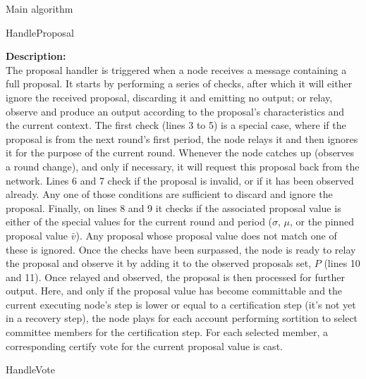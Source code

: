 \documentclass[10pt,a4paper]{article}
\begin{document}
\begin{section}{Main algorithm}
\begin{subsection}{HandleProposal}
    
    \noindent \textbf{Description:}\\
The proposal handler is triggered when a node receives a message containing a full proposal.
It starts by performing a series of checks, after which it will either ignore the received
proposal, discarding it and emitting no output; or relay, observe and produce an output
according to the proposal's characteristics and the current context.
The first check (lines 3 to 5) is a special case, where if the proposal is from the next round's 
first period, the node relays it and then ignores it for the purpose of the current round. 
Whenever the node catches up (observes a round change), and only if necessary, it will request 
this proposal back from the network.
Lines 6 and 7 check if the proposal is invalid, or if it has been observed already. Any one of those
conditions are sufficient to discard and ignore the proposal.
Finally, on lines 8 and 9 it checks if the associated proposal value is either of the special values for the current
round and period ($\sigma$, $\mu$, or the pinned proposal value $\bar{v}$). Any proposal whose proposal value does not match
one of these is ignored.
Once the checks have been surpassed, the node is ready to relay the proposal and observe it by adding
it to the observed proposals set, $P$ (lines 10 and 11).
Once relayed and observed, the proposal is then processed for further output.
Here, and only if the proposal value has become committable and the current executing node's step is lower or equal
to a certification step (it's not yet in a recovery step), the node plays for each account performing sortition
to select committee members for the certification step. For each selected member, a corresponding certify vote for
the current proposal value is cast.


\end{subsection}


\begin{subsection}{HandleVote}\label{ssect:HandleVote}

    \begin{algorithm}[H]
        \caption{\underline{HandleVote}}
        \label{algo:handle-vote}
        \begin{algorithmic}[1]

            

\end{algorithmic}
\end{algorithm}
\end{subsection}
\end{section}
\end{document}
